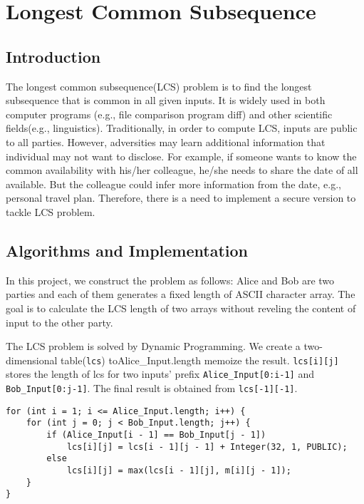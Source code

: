\section{Longest Common Subsequence}

\subsection{Introduction}
The longest common subsequence(LCS) problem is to find the longest subsequence that is common in all given inputs.
It is widely used in both computer programs (e.g., file comparison program diff) and other scientific fields(e.g., linguistics).
Traditionally, in order to compute LCS, inputs are public to all parties.
However, adversities may learn additional information that individual may not want to disclose.
For example, if someone wants to know the common availability with his/her colleague, he/she needs to share the date of all available.
But the colleague could infer more information from the date, e.g., personal travel plan.
Therefore, there is a need to implement a secure version to tackle LCS problem.


\subsection{Algorithms and Implementation}
In this project, we construct the problem as follows: Alice and Bob are two parties and each of them generates a fixed length of ASCII character array.
The goal is to calculate the LCS length of two arrays without reveling the content of input to the other party.

The LCS problem is solved by Dynamic Programming.
We create a two-dimensional table({\tt lcs}) toAlice\_Input.length memoize the result.
{\tt lcs[i][j]} stores the length of lcs for two inputs' prefix {\tt Alice\_Input[0:i-1]} and {\tt Bob\_Input[0:j-1]}.
The final result is obtained from {\tt lcs[-1][-1]}.


\begin{verbatim}
for (int i = 1; i <= Alice_Input.length; i++) {
    for (int j = 0; j < Bob_Input.length; j++) {
        if (Alice_Input[i - 1] == Bob_Input[j - 1])
            lcs[i][j] = lcs[i - 1][j - 1] + Integer(32, 1, PUBLIC);
        else
            lcs[i][j] = max(lcs[i - 1][j], m[i][j - 1]);
    }
}
\end{verbatim}